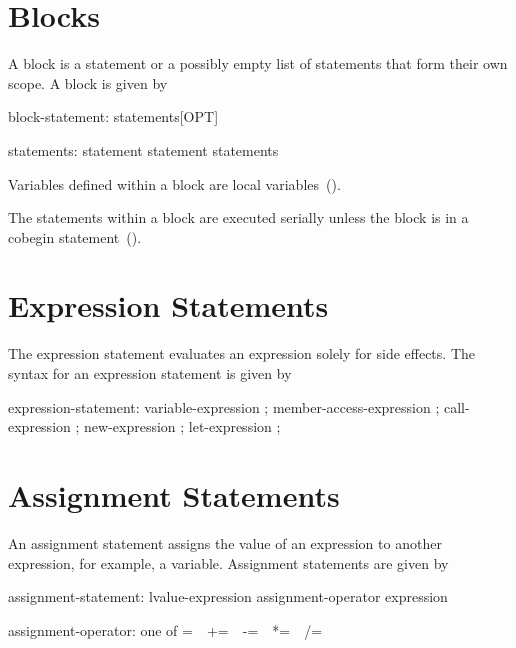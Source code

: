 \section{Blocks}
\label{Blocks}

A block is a statement or a possibly empty list of statements that
form their own scope.  A block is given by
\begin{syntax}
block-statement:
  { statements[OPT] }

statements:
  statement
  statement statements
\end{syntax}

Variables defined within a block are local
variables~().

The statements within a block are executed serially unless the block
is in a cobegin statement~().

\section{Expression Statements}
\label{Expression_Statements}
The expression statement evaluates an expression solely for side
effects. The syntax for an expression statement is given by
\begin{syntax}
expression-statement:
  variable-expression ;
  member-access-expression ;
  call-expression ;
  new-expression ;
  let-expression ;
\end{syntax}

\section{Assignment Statements}
\label{Assignment_Statements}

An assignment statement assigns the value of an expression to another
expression, for
example, a variable.  Assignment statements are given by

\begin{syntax}
assignment-statement:
  lvalue-expression assignment-operator expression

assignment-operator: one of
   = $ $ $ $ += $ $ $ $ -= $ $ $ $ *= $ $ $ $ /= $ $ $ $ %
\end{syntax}

